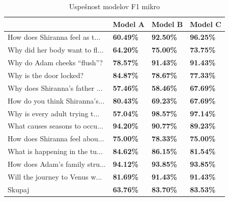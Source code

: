 \documentclass[journal]{IEEEtran}
\begin{document}
\begin{table}[]
	\begin{tabular}{l|l|l|l|}
		\cline{2-4}
		                            & Model A          & Model B          & Model C          \\ \hline


	
	\multicolumn{1}{|l|}{How does Shiranna feel as t...} & \textbf{60.49\%} & \textbf{92.50\%} & \textbf{96.25\%} \\ \hline
	\multicolumn{1}{|l|}{Why did her body want to fl...} & \textbf{64.20\%} & \textbf{75.00\%} & \textbf{73.75\%} \\ \hline
	\multicolumn{1}{|l|}{Why do Adam cheeks “flush”?} & \textbf{78.57\%} & \textbf{91.43\%} & \textbf{91.43\%} \\ \hline
	\multicolumn{1}{|l|}{Why is the door locked?} & \textbf{84.87\%} & \textbf{78.67\%} & \textbf{77.33\%} \\ \hline
	\multicolumn{1}{|l|}{Why does Shiranna’s father ...} & \textbf{57.46\%} & \textbf{58.46\%} & \textbf{67.69\%} \\ \hline
	\multicolumn{1}{|l|}{How do you think Shiranna’s...} & \textbf{80.43\%} & \textbf{69.23\%} & \textbf{67.69\%} \\ \hline
	\multicolumn{1}{|l|}{Why is every adult trying t...} & \textbf{57.04\%} & \textbf{98.57\%} & \textbf{97.14\%} \\ \hline
	\multicolumn{1}{|l|}{What causes seasons to occu...} & \textbf{94.20\%} & \textbf{90.77\%} & \textbf{89.23\%} \\ \hline
	\multicolumn{1}{|l|}{How does Shiranna feel abou...} & \textbf{75.00\%} & \textbf{78.33\%} & \textbf{75.00\%} \\ \hline
	\multicolumn{1}{|l|}{What is happening in the tu...} & \textbf{84.62\%} & \textbf{86.15\%} & \textbf{81.54\%} \\ \hline
	\multicolumn{1}{|l|}{How does Adam’s family stru...} & \textbf{94.12\%} & \textbf{93.85\%} & \textbf{93.85\%} \\ \hline
	\multicolumn{1}{|l|}{Will the journey to Venus w...} & \textbf{81.69\%} & \textbf{91.43\%} & \textbf{91.43\%} \\ \hline
	\multicolumn{1}{|l|}{Skupaj} & \textbf{63.76\%} & \textbf{83.70\%} & \textbf{83.53\%} \\ \hline
		
		
	\end{tabular}
	\caption{Uspešnost modelov F1 mikro}
	\label{t:mod}
\end{table}
\end{document}
